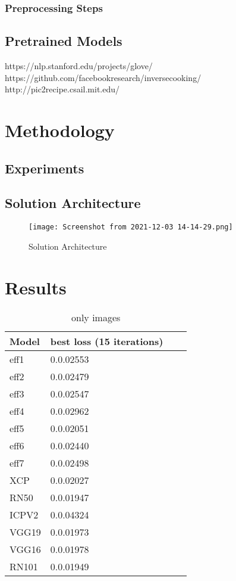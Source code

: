 \documentclass{article}
\begin{document}
\subsubsection{Preprocessing Steps}

\subsection{Pretrained Models}
https://nlp.stanford.edu/projects/glove/ \\
https://github.com/facebookresearch/inversecooking/ \\
http://pic2recipe.csail.mit.edu/

\section{Methodology}

\subsection{Experiments}
\subsection{Solution Architecture}
\begin{figure}[H]
\texttt{[image: Screenshot from 2021-12-03 14-14-29.png]}
\caption{Solution Architecture}
\end{figure}



\section{Results}

\begin{table}[h]
\begin{center}
\begin{tabular}{| l | l | l | l |}

\hline
Model & best loss (15 iterations) \\ \hline
eff1 & 0.0.02553 \\ \hline
eff2 & 0.0.02479 \\ \hline
eff3 & 0.0.02547\\ \hline
eff4 & 0.0.02962\\ \hline
eff5 & 0.0.02051\\ \hline
eff6 & 0.0.02440\\ \hline
eff7 & 0.0.02498\\ \hline
XCP  & 0.0.02027\\ \hline
RN50 & 0.0.01947\\ \hline
ICPV2 & 0.0.04324\\ \hline
VGG19 & 0.0.01973\\ \hline
VGG16 & 0.0.01978\\ \hline
RN101 & 0.0.01949\\ \hline
\end{tabular}
\end{center}
\caption{\label{tab:table-4}only images}
\end{table}
\end{document}
